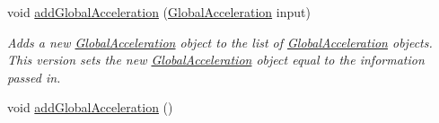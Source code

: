 \begin{DoxyCompactItemize}
void \hyperlink{classosea_1_1ofreq_1_1_outputs_body_a38f7909d116feefc04acc11f58515c8c}{add\-Global\-Acceleration} (\hyperlink{classosea_1_1ofreq_1_1_global_acceleration}{Global\-Acceleration} input)
\begin{DoxyCompactList}\small\item\em Adds a new \hyperlink{classosea_1_1ofreq_1_1_global_acceleration}{Global\-Acceleration} object to the list of \hyperlink{classosea_1_1ofreq_1_1_global_acceleration}{Global\-Acceleration} objects. This version sets the new \hyperlink{classosea_1_1ofreq_1_1_global_acceleration}{Global\-Acceleration} object equal to the information passed in. \end{DoxyCompactList}\item 
\hypertarget{classosea_1_1ofreq_1_1_outputs_body_a3205155873f5db270a71377e5ff80bb4}{void \hyperlink{classosea_1_1ofreq_1_1_outputs_body_a3205155873f5db270a71377e5ff80bb4}{add\-Global\-Acceleration} ()}\label{classosea_1_1ofreq_1_1_outputs_body_a3205155873f5db270a71377e5ff80bb4}


\end{DoxyCompactItemize}
